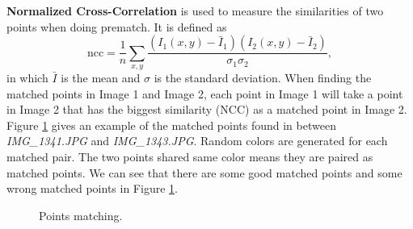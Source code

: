 \documentclass[paper=a4, fontsize=11pt]{scrartcl}
\begin{document}
\textbf{Normalized Cross-Correlation} is used to measure the similarities of two points when doing prematch.
It is defined as 
\begin{equation}
\mbox{ncc} = \frac{1}{n} \sum_{x, y} \frac{(I_{1}(x,y)-\bar{I}_{1})(I_{2}(x,y)-\bar{I}_{2})}{\sigma_{1}\sigma_{2}},
\end{equation}
in which $ \bar{I} $ is the mean and $ \sigma $ is the standard deviation.
When finding the matched points in Image 1 and Image 2, each point in Image 1 will take a point in Image 2 that has the biggest similarity (NCC) as a matched point in Image 2.
Figure \ref{fig:matching} gives an example of the matched points found in between \emph{IMG\_1341.JPG} and \emph{IMG\_1343.JPG}. 
Random colors are generated for each matched pair. 
The two points shared same color means they are paired as matched points.
We can see that there are some good matched points and some wrong matched points in Figure \ref{fig:matching}.

\begin{figure}[h]
	\centering
	\caption{Points matching.}
	\label{fig:matching}
\end{figure}
\end{document}
